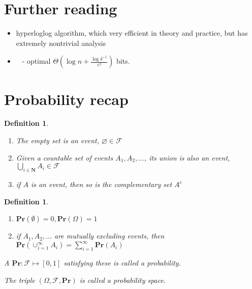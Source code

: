\documentclass[11pt]{article}
\newcommand{\Ppb}{\mathbf{Pr}}
\newcommand{\sF}{\mathcal{F}}
\newcommand{\Nat}{\mathbf{N}}
\newtheorem{definition}[theorem]{Definition}
\begin{document}
\section{Further reading}
\begin{itemize}
    \item hyperloglog algorithm, which very efficient in theory and practice, but has extremely nontrivial analysis \cite{DBLP:conf/esa/DurandF03} \cite{DBLP:conf/edbt/HeuleNH13}
    \item\ \cite{DBLP:conf/soda/Blasiok18} - optimal $\Theta(\log{n} + \frac{\log{\delta^{-1}}}{\varepsilon^2})$ bits.

\end{itemize}





\appendix
\section{Probability recap}
\begin{definition}
\begin{enumerate}
    \item The empty set is an event, $\varnothing \in \sF$
    \item Given a countable set of events $A_1, A_2, \dots$, its union is also an event, $\bigcup_{i\in\Nat}A_i \in \sF$
    \item if $A$ is an event, then so is the complementary set $A^c$
\end{enumerate}
\end{definition}

\begin{definition}
\begin{enumerate}
    \item $\Ppb(\emptyset)=0, \Ppb(\Omega)=1$
    \item if $A_1, A_2, \dots$ are mutually excluding events, then $\Ppb\left(\cup_{i=1}^{\infty} A_{i}\right)=\sum_{i=1}^{\infty} \Ppb\left(A_{i}\right)$
\end{enumerate}
A $\Ppb: \mathcal{F} \mapsto[0,1]$ satisfying these is called a probability.

The triple $(\Omega, \mathcal{F}, \Ppb)$ is called a probability space.
\end{definition}
\end{document}
